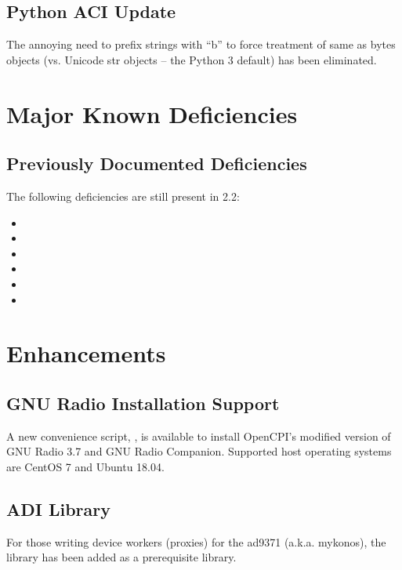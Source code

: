 \subsection{Python ACI Update}
\label{sec:22_aci}
The annoying need to prefix strings with ``b'' to force treatment of same as bytes objects (vs. Unicode str objects -- the Python 3 default) has been eliminated.

\section{Major Known Deficiencies}
\label{sec:22_bugs}

\subsection{Previously Documented Deficiencies}
The following deficiencies are still present in 2.2:
\begin{itemize}
\setlength\itemsep{0em} %
\item {}
\item {}
\item {}
\item {}
\item {}
\item {}
\end{itemize}


\def\ocpiversion{v2.1.0}
\section{Enhancements}

\subsection{GNU Radio Installation Support}
\label{sec:21_gnuradio_install}
A new convenience script, , is available to install OpenCPI's modified version of GNU Radio 3.7 and GNU Radio Companion.  Supported host operating systems are CentOS 7 and Ubuntu 18.04.

\subsection{ADI  Library}
\label{sec:21_mykonos_library}
For those writing device workers (proxies) for the ad9371 (a.k.a. mykonos), the  library has been added as a prerequisite library.

